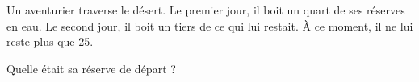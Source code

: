 
\begin{exercice}\label{exoPremiere-0006}

    Un aventurier traverse le désert. Le premier jour, il boit un quart de ses réserves en eau. Le second jour, il boit un tiers de ce qui lui restait. À ce moment, il ne lui reste plus que \unit{25}{\centi\liter}.

    Quelle était sa réserve de départ ?

\end{exercice}
